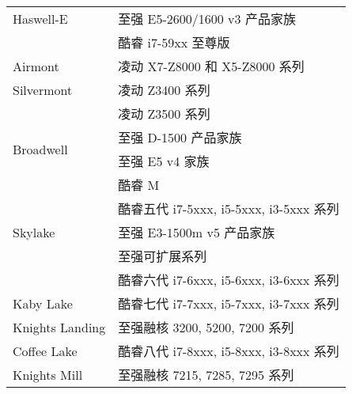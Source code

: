 \begin{multicols}{2}
\begin{table}[H]
\begin{tabular}{|l|l|}
    \hline
    \multirow{1}[4]{*}{Haswell-E} & 至强 E5-2600/1600 v3 产品家族 \\
\cline{2-2}          & 酷睿 i7-59xx 至尊版 \\
    \hline
    Airmont & 凌动 X7-Z8000 和 X5-Z8000 系列 \\
    \hline
    \multirow{1}[4]{*}{Silvermont} & 凌动 Z3400 系列 \\
\cline{2-2}          & 凌动 Z3500 系列 \\
    \hline
    \multirow{2}[8]{*}{Broadwell} & 至强 D-1500 产品家族 \\
\cline{2-2}          & 至强 E5 v4 家族 \\
\cline{2-2}          & 酷睿 M \\
\cline{2-2}          & 酷睿五代 i7-5xxx, i5-5xxx, i3-5xxx 系列 \\
    \hline
    \multirow{1}[6]{*}{Skylake} & 至强 E3-1500m v5 产品家族 \\
\cline{2-2}          & 至强可扩展系列 \\
\cline{2-2}          & 酷睿六代 i7-6xxx, i5-6xxx, i3-6xxx 系列 \\
    \hline
    Kaby Lake & 酷睿七代 i7-7xxx, i5-7xxx, i3-7xxx 系列 \\
    \hline
    Knights Landing & 至强融核 3200, 5200, 7200 系列 \\
    \hline
    Coffee Lake & 酷睿八代 i7-8xxx, i5-8xxx, i3-8xxx 系列 \\
    \hline
    Knights Mill & 至强融核 7215, 7285, 7295 系列 \\
    \hline
    \end{tabular}
\end{table}
\end{multicols}
\restoregeometry